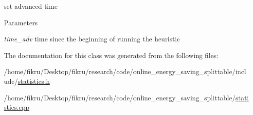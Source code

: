 set advanced time 


\begin{DoxyParams}{Parameters}
\item[{\em time\_\-adv}]time since the beginning of running the heuristic \end{DoxyParams}


The documentation for this class was generated from the following files:\begin{DoxyCompactItemize}
\item 
/home/fikru/Desktop/fikru/research/code/online\_\-energy\_\-saving\_\-splittable/include/\hyperlink{statistics_8h}{statistics.h}\item 
/home/fikru/Desktop/fikru/research/code/online\_\-energy\_\-saving\_\-splittable/\hyperlink{statistics_8cpp}{statistics.cpp}\end{DoxyCompactItemize}
